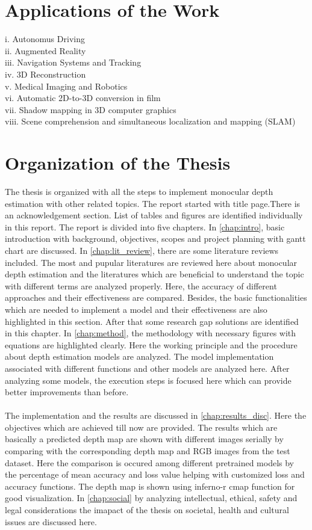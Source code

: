 \documentclass[a4paper,12pt,oneside]{book}
\begin{document}
\section{Applications of the Work}
i. Autonomus Driving\\
ii. Augmented Reality\\
iii. Navigation Systems and Tracking\\
iv. 3D Reconstruction\\
v. Medical Imaging and Robotics\\
vi. Automatic 2D-to-3D conversion in film\\
vii. Shadow mapping in 3D computer graphics\\
viii. Scene comprehension and simultaneous localization and mapping (SLAM)
\section{Organization of the Thesis}
The thesis is organized with all the steps to implement monocular depth estimation with other related topics.
The report started with title page.There is an acknowledgement section. List of tables and figures are identified individually in this report. The report is divided into five chapters. In \autoref{chap:intro}, basic introduction with background, objectives, scopes and project planning with gantt chart are discussed.
In \autoref{chap:lit_review}, there are some literature reviews included. The most and pupular literatures are reviewed here about monocular depth estimation and the literatures which are beneficial to understand the topic with different terms are analyzed properly. Here, the accuracy of different approaches and their effectiveness are compared. Besides, the basic functionalities which are needed to implement a model and their effectiveness are also highlighted in this section. After that some research gap solutions are identified in this chapter.
In \autoref{chap:method}, the methodology with necessary figures with equations are highlighted clearly. Here the working principle and the procedure about depth estimation models are analyzed. The model implementation associated with different functions and other models are analyzed here. After analyzing some models, the execution steps is focused here which can provide better improvements than before.\\\\
The implementation and the results are discussed in \autoref{chap:results_disc}. Here the objectives which are achieved till now are provided. The results which are basically a predicted depth map are shown with different images serially by comparing with the corresponding depth map and RGB images from the test dataset. Here the comparison is occured among different pretrained models by the percentage of mean accuracy and loss value helping with customized loss and accuracy functions. The depth map is shown using inferno-r cmap function for good visualization.  In \autoref{chap:social} by analyzing intellectual, ethical, safety and legal considerations the imapact of the thesis on societal, health and cultural issues are discussed here.
\end{document}

